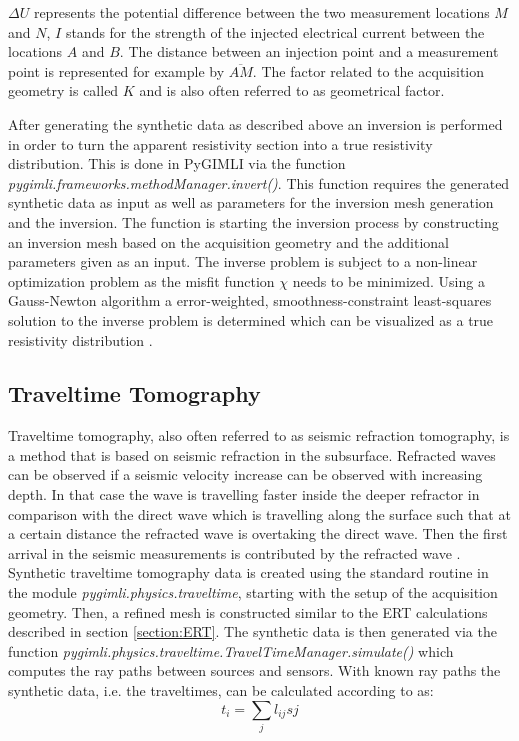 $\Delta U$ represents the potential difference between the two measurement locations $M$ and $N$, $I$ stands for the strength of the injected electrical current between the locations $A$ and $B$. The distance between an injection point and a measurement point is represented for example by $\overline{AM}$. The factor related to the acquisition geometry is called $K$ and is also often referred to as geometrical factor. 

After generating the synthetic data as described above an inversion is performed in order to turn the apparent resistivity section into a true resistivity distribution. This is done in PyGIMLI via the function \textit{pygimli.frameworks.methodManager.invert()}. This function requires the generated synthetic data as input as well as parameters for the inversion mesh generation and the inversion. The function is starting the inversion process by constructing an inversion mesh based on the acquisition geometry and the additional parameters given as an input. The inverse problem is subject to a non-linear optimization problem as the misfit function $\chi$ needs to be minimized. Using a Gauss-Newton algorithm a error-weighted, smoothness-constraint least-squares solution to the inverse problem is determined which can be visualized as a true resistivity distribution \citep{Ruecker2017}.

\subsection{Traveltime Tomography}\label{section:TT}
Traveltime tomography, also often referred to as seismic refraction tomography, is a method that is based on seismic refraction in the subsurface. Refracted waves can be observed if a seismic velocity increase can be observed with increasing depth. In that case the wave is travelling faster inside the deeper refractor in comparison with the direct wave which is travelling along the surface such that at a certain distance the refracted wave is overtaking the direct wave. Then the first arrival in the seismic measurements is contributed by the refracted wave \citep{kearey2002introduction}. Synthetic traveltime tomography data is created using the standard routine in the module \textit{pygimli.physics.traveltime}, starting with the setup of the acquisition geometry. Then, a refined mesh is constructed similar to the ERT calculations described in section \ref{section:ERT}. The synthetic data is then generated via the function \textit{pygimli.physics.traveltime.TravelTimeManager.simulate()} which computes the ray paths between sources and sensors. With known ray paths the synthetic data, i.e. the traveltimes, can be calculated according to \citet{zelt2021traveltime} as:
\begin{equation}
    t_i = \sum_j l_{ij}sj
    \label{Eq:TT}
\end{equation}

